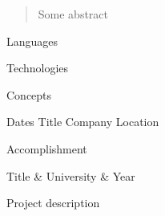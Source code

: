 \documentclass{cv}
\begin{document}

\begin{abstract}
  Some abstract
\end{abstract}

\begin{skills}
\item Languages
\item Technologies
\item Concepts
\end{skills}

\begin{jobs}
\item \job
  {Dates}
  {Title}
  {Company}
  {Location}
  {
  \item Accomplishment
  }
\end{jobs}

\begin{education}
  Title & University & Year
\end{education}

\begin{projects}
\item Project description
\end{projects}
\end{document}
